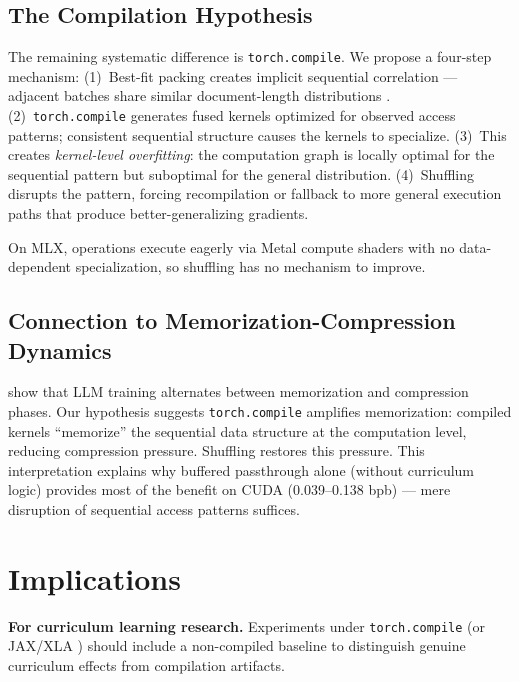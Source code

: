 \documentclass{article}
\begin{document}
\subsection{The Compilation Hypothesis}

The remaining systematic difference is \texttt{torch.compile}.
We propose a four-step mechanism:
(1)~Best-fit packing creates implicit sequential correlation ---
adjacent batches share similar document-length distributions
\cite{fewertruncations2024}.
(2)~\texttt{torch.compile} generates fused kernels optimized for
observed access patterns; consistent sequential structure causes
the kernels to specialize.
(3)~This creates \emph{kernel-level overfitting}: the computation
graph is locally optimal for the sequential pattern but suboptimal
for the general distribution.
(4)~Shuffling disrupts the pattern, forcing recompilation or
fallback to more general execution paths that produce
better-generalizing gradients.

On MLX, operations execute eagerly via Metal compute shaders with
no data-dependent specialization, so shuffling has no mechanism
to improve.

\subsection{Connection to Memorization-Compression Dynamics}

\citet{gapt2025} show that LLM training alternates between memorization
and compression phases. Our hypothesis suggests \texttt{torch.compile}
amplifies memorization: compiled kernels ``memorize'' the sequential
data structure at the computation level, reducing compression pressure.
Shuffling restores this pressure. This interpretation explains why
buffered passthrough alone (without curriculum logic) provides most
of the benefit on CUDA (0.039--0.138 bpb) --- mere disruption of
sequential access patterns suffices.

\section{Implications}\label{sec:implications}

\textbf{For curriculum learning research.}
Experiments under \texttt{torch.compile} (or JAX/XLA \cite{jax2018})
should include a non-compiled baseline to distinguish genuine curriculum
effects from compilation artifacts.
\end{document}
